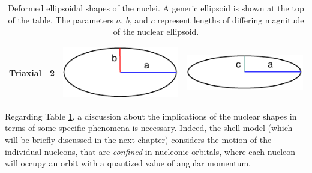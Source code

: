 \begin{table}[ht]
\begin{tabular}{|c|c|c|c|}
        Triaxial & 2                                                              &   \includegraphics[scale=0.7]{Chapters/Figures/ellipse_triaxial_1.pdf}  &     \includegraphics[scale=0.7]{Chapters/Figures/ellipse_triaxial_2.pdf}      \\ \hline
        \end{tabular}
    \caption{Deformed ellipsoidal shapes of the nuclei. A generic ellipsoid is shown at the top of the table. The parameters $a$, $b$, and $c$ represent lengths of differing magnitude of the nuclear ellipsoid.}
    \label{table-ellipsoidal-shapes}
    \end{table}

    Regarding Table \ref{table-ellipsoidal-shapes}, a discussion about the implications of the nuclear shapes in terms of some specific phenomena is necessary. Indeed, the shell-model (which will be briefly discussed in the next chapter) considers the motion of the individual nucleons, that are \emph{confined} in nucleonic orbitals, where each nucleon will occupy an orbit with a quantized value of angular momentum.